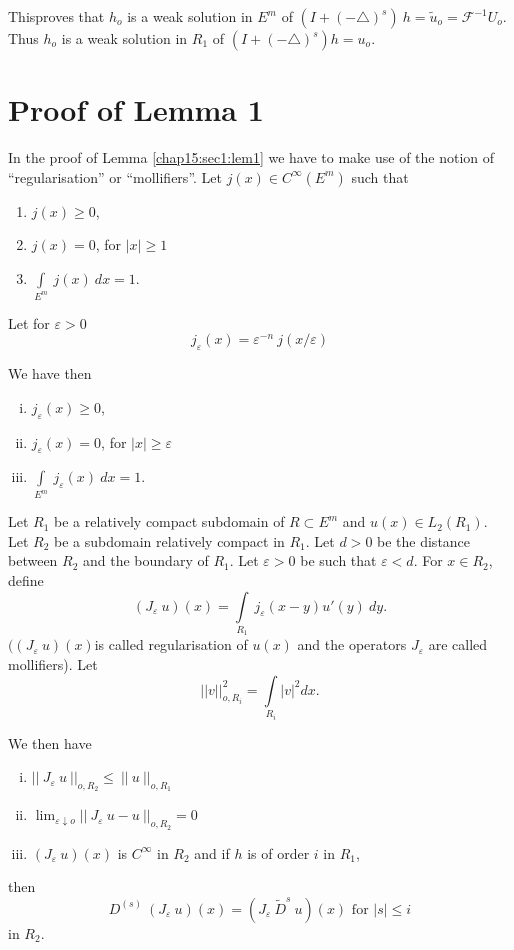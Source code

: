 This\pageoriginale proves that $h_o$ is a weak solution in $E^m$ of $(I +
(-\triangle)^s) ~ h = \tilde{u}_o = \mathscr{F}^{-1} U_o$. Thus $h_o$
is a weak solution in $R_1$ of $(I + (-\triangle)^s)h = u_o$. 

\section{Proof of Lemma 1}\label{chap17:sec2}

 In the proof of Lemma \ref{chap15:sec1:lem1} we have to make use of
 the notion of 
 ``regularisation'' or ``mollifiers''. Let $j(x) \in C^\infty(E^m)$ such
 that 
 \begin{enumerate}[\rm i)]
 \item $j(x) \ge 0$,
 \item $j(x) = 0$, for $| x | \ge 1$
 \item $\int\limits_{E^m} ~ j(x) ~ dx = 1$.
 \end{enumerate}

Let for $\varepsilon > 0$ 
$$
j_\varepsilon (x) = \varepsilon^{-n} ~ j(x/\varepsilon)
$$

We have then
\begin{enumerate}[i)]
\item $j_\varepsilon (x) \ge 0$,
\item $j_\varepsilon(x) = 0$, for $| x | \ge \varepsilon$
\item $\int\limits_{E^m} ~ j_\varepsilon(x) ~ dx = 1$.
\end{enumerate}

Let $R_1$ be a relatively compact subdomain of $R \subset E^m$ and
$u(x) \in L_2 (R_1)$. Let $R_2$ be a subdomain relatively compact in
$R_1$. Let $d > 0$ be the distance between $R_2$ and the boundary of
$R_1$. Let $\varepsilon > 0$ be such that $\varepsilon < d$. For $x
\in R_2$, define 
$$
(J_\varepsilon ~ u) (x) = \int\limits_{R_1} ~ j_\varepsilon (x-y) u' (y) ~ dy.
$$
$((J_\varepsilon ~u) (x)$\pageoriginale is called regularisation of $u(x)$ and the
operators $J_\varepsilon$ are called mollifiers). Let 
$$
 ||v||^2_{o,R_i} = \int\limits_{R_i} |v |^2 dx.
$$

We then have
\begin{enumerate}[i)]
\item $|| ~J_\varepsilon ~ u ~||_{o,R_2} \le ~ || ~ u ~ ||_{o,R_1}$
\item $\lim_{\varepsilon \downarrow o} || ~ J_\varepsilon ~ u - u ~ ||_{o,R_2} = 0$
\item $(J_\varepsilon ~u) (x)$ is $C^\infty$ in $R_2$ and if $h$ is of order $i$ in $R_1$, 
\end{enumerate}
then
$$
D^{(s)} ~ (J_\varepsilon ~ u)(x) = (J_\varepsilon ~ \tilde{D}^s ~
u)(x) \text{ for } | s | \le i 
$$
in $R_2$.

